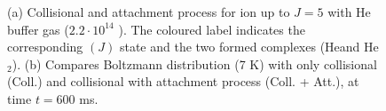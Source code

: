 \begin{figure}[!htb]
    \hfill
    
    \caption{(a) Collisional and attachment process for \CD ion up to $J=5$ with He buffer gas ($2.2 \cdot 10^{14}$ \percc). The coloured label indicates the corresponding \CD$(J)$ state and the two formed complexes (He\CD and He$_2$\CD). (b) Compares Boltzmann distribution (7 K) with only collisional (Coll.) and collisional with attachment process (Coll. + Att.), at time $t=600$ ms. }
    \label{fig:ROSAA-sim-attachment-boltzman-comparision}
\end{figure}